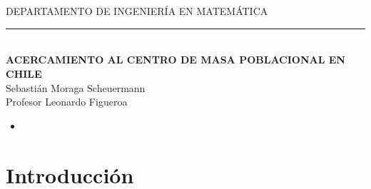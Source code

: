 \documentclass[20pt]{report}
\begin{document}
\begin{center}
\\
\\

{DEPARTAMENTO DE INGENIER\'IA EN MATEM\'ATICA}
\end{center}
\begin{center}
\noindent\rule{15cm}{.5pt}\\
\vspace{2cm}
\textbf{\Large{ACERCAMIENTO AL CENTRO DE MASA POBLACIONAL EN CHILE}}\\

\Large{Sebasti\'an Moraga Scheuermann}\\

\Large{Profesor Leonardo Figueroa}\\

\end{center}



 \vspace{.2cm}
  \noindent
\begin{itemize}
\item [\bf ]{\bf    }
\topmargin=-1.6cm


\end{itemize}
\topmargin=-1.6cm
\vspace{3cm}
\noindent 






\pagebreak


 \tableofcontents %


\chapter{Introducci\'on}\label{cap.introduccion}
\end{document}
